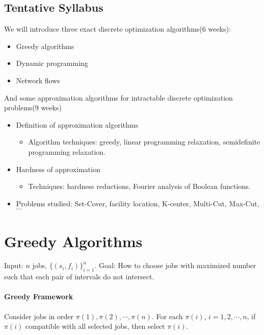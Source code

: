 \subsection{Tentative Syllabus}
We will introduce three exact discrete optimization algorithms(6 weeks):
\begin{itemize}
    \item Greedy algorithms
    \item Dynamic programming
    \item Network flows
\end{itemize}
And some approximation algorithms for intractable discrete optimization problems(9 weeks)
\begin{itemize}
    \item Definition of approximation algorithms
    \begin{itemize}
        \item Algorithm techniques: greedy, linear programming relaxation, semidefinite programming relaxation.
    \end{itemize}
    \item Hardness of approximation 
    \begin{itemize}
        \item Techniques: hardness reductions, Fourier analysis of Boolean functions.
    \end{itemize}
    \item Problems studied: Set-Cover, facility location, K-center, Multi-Cut, Max-Cut, $  \cdots $ 
\end{itemize}
\section{Greedy Algorithms}
\begin{example}
    Input:  $ n  $ jobs,  $\{ (s_i,f_i)\}_{i=1}^n $. Goal: How to choose jobs with maximized number such that each pair of  intervals do not intersect. 
\end{example}
\paragraph{Greedy Framework}
Consider jobs in order  $ \pi(1),\pi(2),\cdots,\pi(n) $. For each  $ \pi(i) $,  $ i=1,2,\cdots,n $, if  $ \pi(i) $ compatible with all selected jobs, then select  $ \pi(i) $.

